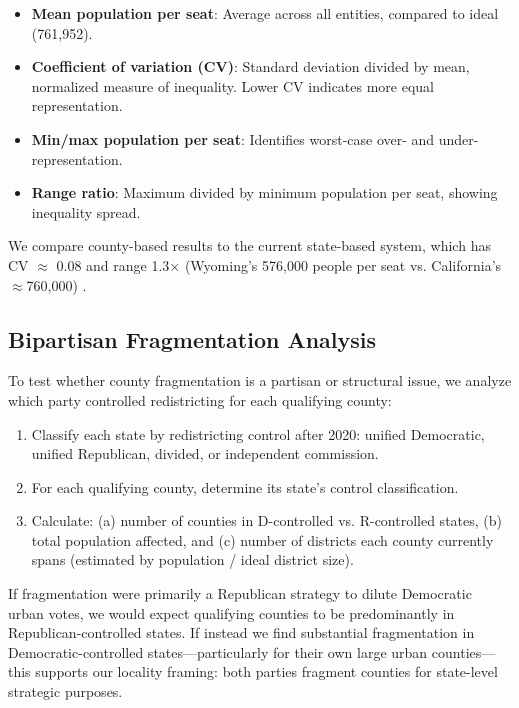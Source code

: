 \begin{itemize}
\item \textbf{Mean population per seat}: Average across all entities, compared to ideal (761,952).
\item \textbf{Coefficient of variation (CV)}: Standard deviation divided by mean, normalized measure of inequality. Lower CV indicates more equal representation.
\item \textbf{Min/max population per seat}: Identifies worst-case over- and under-representation.
\item \textbf{Range ratio}: Maximum divided by minimum population per seat, showing inequality spread.
\end{itemize}

We compare county-based results to the current state-based system, which has CV $\approx$ 0.08 and range 1.3$\times$ (Wyoming's 576,000 people per seat vs. California's $\approx$760,000) \citep{balinski2001fair}.

\subsection{Bipartisan Fragmentation Analysis}

To test whether county fragmentation is a partisan or structural issue, we analyze which party controlled redistricting for each qualifying county:

\begin{enumerate}
\item Classify each state by redistricting control after 2020: unified Democratic, unified Republican, divided, or independent commission.
\item For each qualifying county, determine its state's control classification.
\item Calculate: (a) number of counties in D-controlled vs. R-controlled states, (b) total population affected, and (c) number of districts each county currently spans (estimated by population / ideal district size).
\end{enumerate}

If fragmentation were primarily a Republican strategy to dilute Democratic urban votes, we would expect qualifying counties to be predominantly in Republican-controlled states. If instead we find substantial fragmentation in Democratic-controlled states---particularly for their own large urban counties---this supports our locality framing: both parties fragment counties for state-level strategic purposes.

